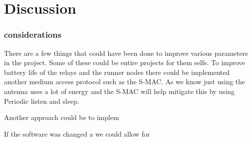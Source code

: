 \chapter{Discussion}
\subsection{considerations}
There are a few things that could have been done to improve various parameters in the project. Some of these could be entire projects for them selfs.
To improve battery life of the relays and the runner nodes there could be implemented another medium access protocol such as the S-MAC. As we know just using the antenna uses a lot of energy and the S-MAC will help mitigate this by using Periodic listen and sleep.

Another approach could be to implem

If the software was changed a we could allow for 